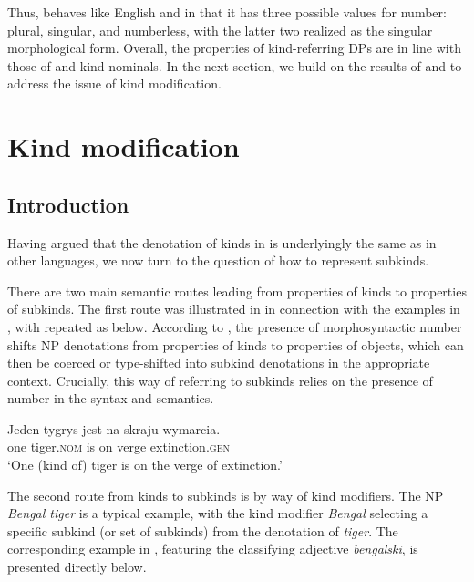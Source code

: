 \documentclass[output=paper]{langscibook}
\begin{document}
\noindent
Thus,  behaves like English and  in that it has three possible values for number: plural, singular, and numberless, with the latter two realized as the singular morphological form. Overall, the properties of  kind-referring DPs are in line with those of  and  kind nominals.
In the next section, we build on the results of  and  to address the issue of kind modification.


\section{Kind modification}\label{sec:4-subkinds}

\subsection{Introduction}

Having argued that the denotation of kinds in  is underlyingly the same as in other languages, we now turn to the question of how to represent subkinds.

There are two main semantic routes leading from properties of kinds to properties of subkinds. The first route was illustrated in  in connection with the examples in , with  repeated as  below. According to \citeauthor{Borik.Espinal2012}, the presence of morphosyntactic number shifts NP denotations from properties of kinds to properties of objects, which can then be coerced or type-shifted into subkind denotations in the appropriate context. Crucially, this way of referring to subkinds relies on the presence of number in the syntax and semantics.

\ea \label{ex:subkind_1} \gll
Jeden tygrys jest na skraju wymarcia.\\
one tiger.\textsc{nom} is on verge extinction.\textsc{gen}\\
\glt `One (kind of) tiger is on the verge of extinction.'
\z

\noindent
The second route from kinds to subkinds is by way of kind modifiers. The NP \textit{Bengal tiger} is a typical example, with the kind modifier \textit{Bengal} selecting a specific subkind (or set of subkinds) from the denotation of \textit{tiger}. The corresponding example in , featuring the classifying adjective \textit{bengalski}, is presented directly below.
\end{document}
